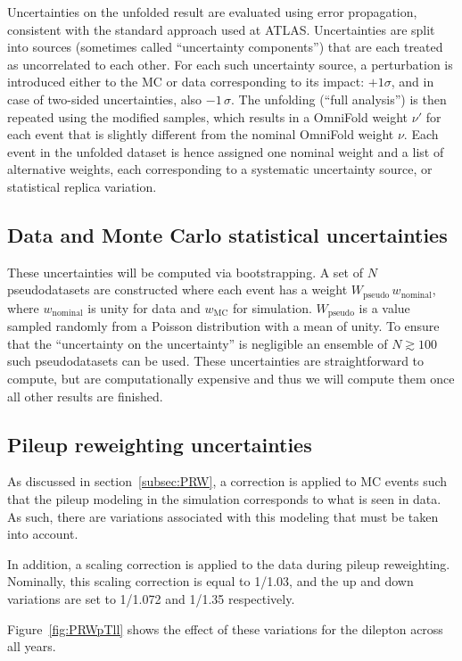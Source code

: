 Uncertainties on the unfolded result are evaluated using error propagation, consistent with the standard approach used at ATLAS.
Uncertainties are split into sources (sometimes called ``uncertainty components'') that are each treated as uncorrelated to each other.
For each such uncertainty source, a perturbation is introduced either to the MC or data corresponding to its impact: $+1\sigma$, and in case of two-sided uncertainties, also $-1\,\sigma$. The unfolding (``full analysis'') is then repeated using the modified samples, which results in a OmniFold weight $\nu'$ for each event that is slightly different from the nominal OmniFold weight $\nu$. Each event in the unfolded dataset is hence assigned one nominal weight and a list of alternative weights, each corresponding to a systematic uncertainty source, or statistical replica variation.

\subsection{Data and Monte Carlo statistical uncertainties}
These uncertainties will be computed via bootstrapping.  A set of $N$ pseudodatasets are constructed where each event has a weight $W_\text{pseudo}\,w_\text{nominal}$, where $w_\text{nominal}$ is unity for data and $w_\text{MC}$ for simulation. $W_\text{pseudo}$ is a value sampled randomly from a Poisson distribution with a mean of unity.  To ensure that the ``uncertainty on the uncertainty'' is negligible an ensemble of $N\gtrsim 100$ such pseudodatasets can be used.  These uncertainties are straightforward to compute, but are computationally expensive and thus we will compute them once all other results are finished.

\subsection{Pileup reweighting uncertainties}
As discussed in section~\ref{subsec:PRW}, a correction is applied to MC events such that the pileup modeling in the simulation corresponds to what is seen in data. As such, there are variations associated with this modeling
that must be taken into account.

In addition, a scaling correction is applied to the data during pileup reweighting. Nominally, this scaling correction is equal to 1/1.03, and the up and down variations are set to 1/1.072 and 1/1.35 respectively.

Figure~\ref{fig:PRWpTll} shows the effect of these variations for the dilepton \pt across all years.

